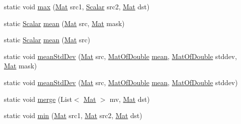 \begin{DoxyCompactItemize}
\item 
static void \mbox{\hyperlink{classorg_1_1opencv_1_1core_1_1_core_aba74797cfade029693c6737957fe3b7f}{max}} (\mbox{\hyperlink{classorg_1_1opencv_1_1core_1_1_mat}{Mat}} src1, \mbox{\hyperlink{classorg_1_1opencv_1_1core_1_1_scalar}{Scalar}} src2, \mbox{\hyperlink{classorg_1_1opencv_1_1core_1_1_mat}{Mat}} dst)
\item 
static \mbox{\hyperlink{classorg_1_1opencv_1_1core_1_1_scalar}{Scalar}} \mbox{\hyperlink{classorg_1_1opencv_1_1core_1_1_core_aff700e66b1cef1a74cfd94d405369edf}{mean}} (\mbox{\hyperlink{classorg_1_1opencv_1_1core_1_1_mat}{Mat}} src, \mbox{\hyperlink{classorg_1_1opencv_1_1core_1_1_mat}{Mat}} mask)
\item 
static \mbox{\hyperlink{classorg_1_1opencv_1_1core_1_1_scalar}{Scalar}} \mbox{\hyperlink{classorg_1_1opencv_1_1core_1_1_core_a25ced9c1cf960900fbed712b13235dbd}{mean}} (\mbox{\hyperlink{classorg_1_1opencv_1_1core_1_1_mat}{Mat}} src)
\item 
static void \mbox{\hyperlink{classorg_1_1opencv_1_1core_1_1_core_af8d7fbb33c11fbf6115d4c242dbbb5b3}{mean\+Std\+Dev}} (\mbox{\hyperlink{classorg_1_1opencv_1_1core_1_1_mat}{Mat}} src, \mbox{\hyperlink{classorg_1_1opencv_1_1core_1_1_mat_of_double}{Mat\+Of\+Double}} \mbox{\hyperlink{classorg_1_1opencv_1_1core_1_1_core_aff700e66b1cef1a74cfd94d405369edf}{mean}}, \mbox{\hyperlink{classorg_1_1opencv_1_1core_1_1_mat_of_double}{Mat\+Of\+Double}} stddev, \mbox{\hyperlink{classorg_1_1opencv_1_1core_1_1_mat}{Mat}} mask)
\item 
static void \mbox{\hyperlink{classorg_1_1opencv_1_1core_1_1_core_a94a681b5485885aa1fbf868fc0718188}{mean\+Std\+Dev}} (\mbox{\hyperlink{classorg_1_1opencv_1_1core_1_1_mat}{Mat}} src, \mbox{\hyperlink{classorg_1_1opencv_1_1core_1_1_mat_of_double}{Mat\+Of\+Double}} \mbox{\hyperlink{classorg_1_1opencv_1_1core_1_1_core_aff700e66b1cef1a74cfd94d405369edf}{mean}}, \mbox{\hyperlink{classorg_1_1opencv_1_1core_1_1_mat_of_double}{Mat\+Of\+Double}} stddev)
\item 
static void \mbox{\hyperlink{classorg_1_1opencv_1_1core_1_1_core_af245932b4a6d1aee20be9610388bb06a}{merge}} (List$<$ \mbox{\hyperlink{classorg_1_1opencv_1_1core_1_1_mat}{Mat}} $>$ mv, \mbox{\hyperlink{classorg_1_1opencv_1_1core_1_1_mat}{Mat}} dst)
\item 
static void \mbox{\hyperlink{classorg_1_1opencv_1_1core_1_1_core_a24561bfde2c7fe7d2b7bee9d5ba8c92e}{min}} (\mbox{\hyperlink{classorg_1_1opencv_1_1core_1_1_mat}{Mat}} src1, \mbox{\hyperlink{classorg_1_1opencv_1_1core_1_1_mat}{Mat}} src2, \mbox{\hyperlink{classorg_1_1opencv_1_1core_1_1_mat}{Mat}} dst)

\end{DoxyCompactItemize}
